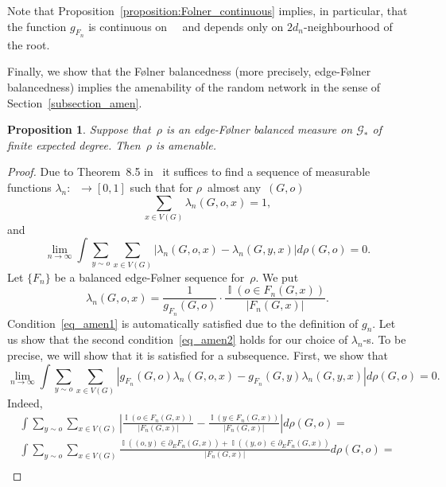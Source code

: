 \documentclass[10pt,a4paper]{amsart}
\newtheorem{proposition}[lemma]{Proposition}
\DeclareMathOperator{\I}{{\mathbb{I}}}
\DeclareMathOperator{\Gr}{{\mathcal{G}_*}}
\DeclareMathOperator{\Grr}{{\mathcal{G}_{**}}}
\begin{document}
Note that Proposition~\ref{proposition:Folner_continuous} implies, in particular, that the function $g_{F_n}$ is continuous on~$\Gr$ and depends only on $2d_n$-neighbourhood of the root.


Finally, we show that the {F\o lner} balancedness (more precisely, edge-{F\o lner} balancedness) implies the amenability of the random network in the sense of Section~\ref{subsection_amen}.

\begin{proposition}\label{proposition:balance_implies_amen}
    Suppose that~$\rho$ is an edge-{F\o lner} balanced measure on $\mathcal{G}_*$ of finite expected degree. Then~$\rho$ is amenable. 
\end{proposition}

\begin{proof}
    Due to Theorem~8.5 in~\cite{AL07} it suffices to find a sequence of measurable functions $\lambda_n \colon \Grr \to [0,1]$ such that for $\rho$~almost any~$(G,o)$
    \begin{equation}\label{eq_amen1}
        \sum_{x \in V(G)} \lambda_n(G, o, x) = 1,
    \end{equation}
    and
    \begin{equation}\label{eq_amen2}
        \lim_{n\to \infty} \int \sum_{y \sim o} \sum_{x \in V(G)} |\lambda_n(G,o,x) - \lambda_n(G,y,x)| d \rho(G,o) = 0.
    \end{equation}
    Let $\{F_n\}$ be a balanced edge-F\o lner sequence for~$\rho$. We put
    $$
    \lambda_n(G,o, x) = \frac{1}{g_{F_n}(G,o)} \cdot\frac{\I(o \in F_n(G,x))}{ |F_n(G,x)|}.
    $$
    Condition~\eqref{eq_amen1} is automatically satisfied due to the definition of $g_n$. Let us show that the second condition~\eqref{eq_amen2} holds for our choice of $\lambda_n$-s. To be precise, we will show that it is satisfied for a subsequence. First, we show that
    \begin{equation}\label{eq_amen3}
        \lim_{n\to \infty} \int \sum_{y \sim o} \sum_{x \in V(G)} |g_{F_n}(G,o)\lambda_n(G,o,x) - g_{F_n} (G,y)\lambda_n(G,y,x)| d \rho(G,o) = 0.
    \end{equation}
    Indeed, 
    \begin{multline}\label{eq_am4567567}
        \int \sum_{y\sim o}\sum_{x \in V(G)} \left| \frac{\I(o \in F_n(G,x))}{ |F_n(G,x)|} - \frac{\I(y \in F_n(G,x))}{ |F_n(G,x)|} \right| d \rho(G,o) = \\
        \int \sum_{y\sim o} \sum_{x\in V(G)} \frac{\I((o,y) \in \partial_E F_n(G,x)) + \I((y,o) \in \partial_E F_n(G,x))}{ |F_n(G,x)|} d \rho(G,o) = \\

\end{multline}
\end{proof}
\end{document}
